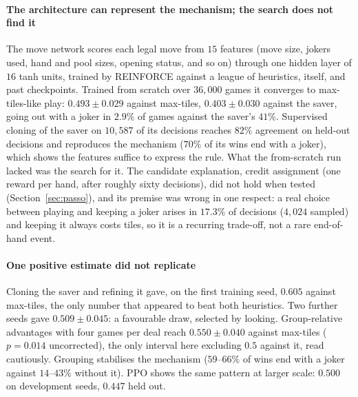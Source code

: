\documentclass[10pt,journal,compsoc]{IEEEtran}
\begin{document}
\begin{table}[t]\centering\small\setlength{\tabcolsep}{4pt}
\caption{Learned and searching agents, scored by game count against the two strongest heuristics ($\pm$ $95\%$ CI; seeds are per opponent, both seats). Rows marked with a signed value are paired differences against the same architecture without the change. The last row is in official points. Every row other than the two PPO rows and the official-reward row is exploratory; multiplicity is not corrected across rows.}\label{tab:rl}

\end{table}

\paragraph*{The architecture can represent the mechanism; the search does not find it}
The move network scores each legal move from $15$ features (move size, jokers used, hand and pool sizes, opening status, and so on) through one hidden layer of $16$ tanh units, trained by REINFORCE against a league of heuristics, itself, and past checkpoints. Trained from scratch over $36{,}000$ games it converges to max-tiles-like play: $0.493\pm0.029$ against max-tiles, $0.403\pm0.030$ against the saver, going out with a joker in $2.9\%$ of games against the saver's $41\%$. Supervised cloning of the saver on $10{,}587$ of its decisions reaches $82\%$ agreement on held-out decisions and reproduces the mechanism ($70\%$ of its wins end with a joker), which shows the features suffice to express the rule. What the from-scratch run lacked was the search for it. The candidate explanation, credit assignment (one reward per hand, after roughly sixty decisions), did not hold when tested (Section~\ref{sec:passo}), and its premise was wrong in one respect: a real choice between playing and keeping a joker arises in $17.3\%$ of decisions ($4{,}024$ sampled) and keeping it always costs tiles, so it is a recurring trade-off, not a rare end-of-hand event.

\paragraph*{One positive estimate did not replicate}
Cloning the saver and refining it gave, on the first training seed, $0.605$ against max-tiles, the only number that appeared to beat both heuristics. Two further seeds gave $0.509\pm0.045$: a favourable draw, selected by looking. Group-relative advantages \cite{shao2024} with four games per deal reach $0.550\pm0.040$ against max-tiles ($p=0.014$ uncorrected), the only interval here excluding $0.5$ against it, read cautiously. Grouping stabilises the mechanism ($59$--$66\%$ of wins end with a joker against $14$--$43\%$ without it). PPO shows the same pattern at larger scale: $0.500$ on development seeds, $0.447$ held out.
\end{document}
